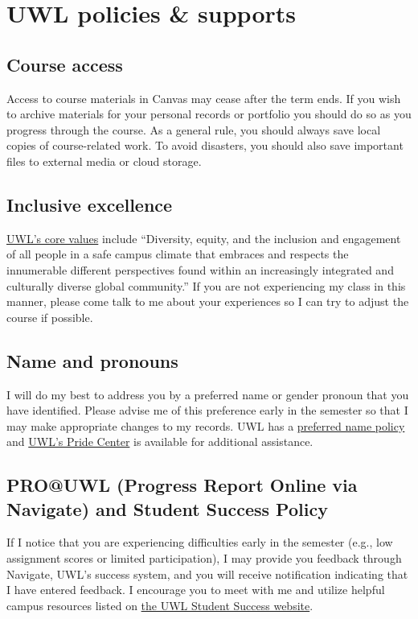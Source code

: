 \documentclass[
    letterpaper,paper=portrait,fleqn,
    DIV=16,fontsize=11pt,twoside=semi,
    parskip=full-,
    headings=standardclasses]
{scrartcl}
\begin{document}
\section*{UWL policies \& supports}

\subsection*{Course access}

Access to course materials in Canvas may cease after the term ends. If you wish to archive materials for your personal records or portfolio you should do so as you progress through the course. As a general rule, you should always save local copies of course-related work. To avoid disasters, you should also save important files to external media or cloud storage.

\subsection*{Inclusive excellence}

\href{https://www.uwlax.edu/chancellor/mission/}{UWL's core values} include ``Diversity, equity, and the inclusion and engagement of all people in a safe campus climate that embraces and respects the innumerable different perspectives found within an increasingly integrated and culturally diverse global community.'' If you are not experiencing my class in this manner, please come talk to me about your experiences so I can try to adjust the course if possible.

\subsection*{Name and pronouns}

I will do my best to address you by a preferred name or gender pronoun that you have identified. Please advise me of this preference early in the semester so that I may make appropriate changes to my records. UWL has a  \href{https://www.uwlax.edu/records/preferred-name/}{preferred name policy} and \href{https://www.uwlax.edu/pride-center/}{UWL's Pride Center} is available for additional assistance.

\subsection*{PRO@UWL (Progress Report Online via Navigate) and Student Success Policy}

If I notice that you are experiencing difficulties early in the semester (e.g., low assignment scores or limited participation), I may provide you feedback through Navigate, UWL's success system, and you will receive notification indicating that I have entered feedback. I encourage you to meet with me and utilize helpful campus resources listed on \href{https://www.uwlax.edu/info/student-success}{the UWL Student Success website}.
\end{document}

